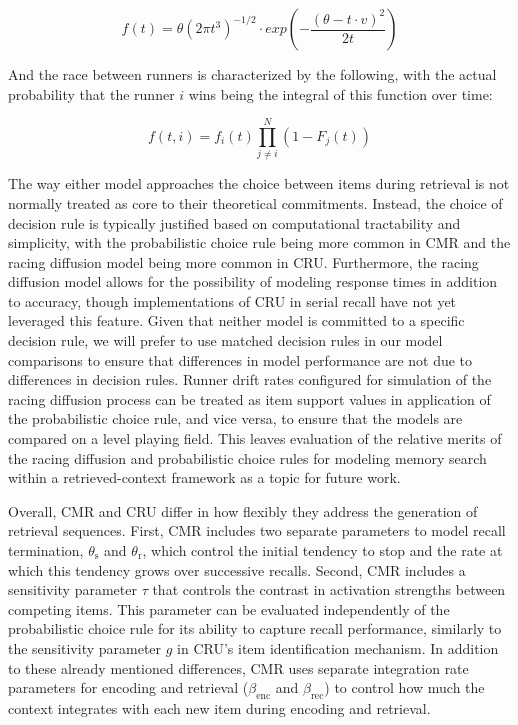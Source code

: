 \documentclass[
  letterpaper,
  11pt,
  english,
  singlespacing,
  headsepline]{MastersDoctoralThesis}
\begin{document}
\[
f(t) = \theta (2 \pi t^3)^{-1/2} \cdot exp(-\frac{(\theta - t \cdot v)^2}{2t})
\]

And the race between runners is characterized by the following, with the
actual probability that the runner \(i\) wins being the integral of this
function over time:

\[
f(t, i) = {f_i}(t) \prod_{j \neq i}^{N} (1 - F_j(t))
\]

The way either model approaches the choice between items during
retrieval is not normally treated as core to their theoretical
commitments. Instead, the choice of decision rule is typically justified
based on computational tractability and simplicity, with the
probabilistic choice rule being more common in CMR and the racing
diffusion model being more common in CRU. Furthermore, the racing
diffusion model allows for the possibility of modeling response times in
addition to accuracy, though implementations of CRU in serial recall
have not yet leveraged this feature. Given that neither model is
committed to a specific decision rule, we will prefer to use matched
decision rules in our model comparisons to ensure that differences in
model performance are not due to differences in decision rules. Runner
drift rates configured for simulation of the racing diffusion process
can be treated as item support values in application of the
probabilistic choice rule, and vice versa, to ensure that the models are
compared on a level playing field. This leaves evaluation of the
relative merits of the racing diffusion and probabilistic choice rules
for modeling memory search within a retrieved-context framework as a
topic for future work.

Overall, CMR and CRU differ in how flexibly they address the generation
of retrieval sequences. First, CMR includes two separate parameters to
model recall termination, \(\theta_\text{s}\) and \(\theta_\text{r}\),
which control the initial tendency to stop and the rate at which this
tendency grows over successive recalls. Second, CMR includes a
sensitivity parameter \(\tau\) that controls the contrast in activation
strengths between competing items. This parameter can be evaluated
independently of the probabilistic choice rule for its ability to
capture recall performance, similarly to the sensitivity parameter \(g\)
in CRU's item identification mechanism. In addition to these already
mentioned differences, CMR uses separate integration rate parameters for
encoding and retrieval (\(\beta_\text{enc}\) and \(\beta_\text{rec}\))
to control how much the context integrates with each new item during
encoding and retrieval.
\end{document}
